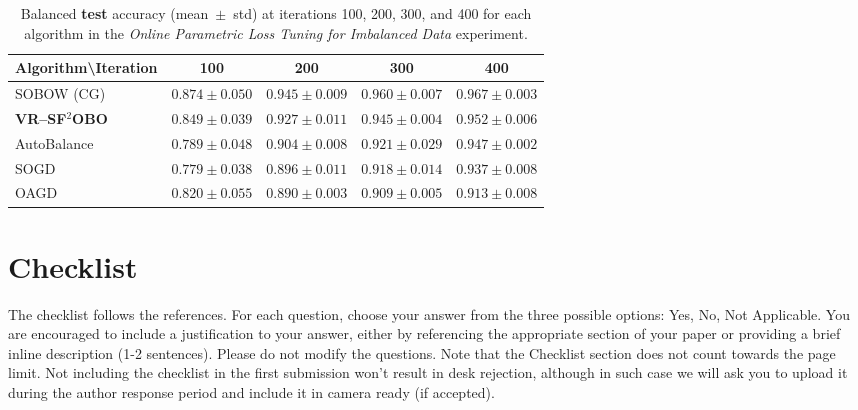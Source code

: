 \documentclass{uai2026} %
\begin{document}
\begin{table}[!htbp]
  \centering
  \begin{adjustbox}{max width=\linewidth}
  \begin{tabular}{lcccc}
    \toprule
    \textbf{Algorithm\textbackslash Iteration} & \textbf{100} & \textbf{200} & \textbf{300} & \textbf{400} \\
    \midrule
    SOBOW (CG)         & $0.874\!\pm\!0.050$ & $0.945\!\pm\!0.009$ & $0.960\!\pm\!0.007$ & $0.967\!\pm\!0.003$ \\
    \textbf{VR--SF$^2$OBO}        & $\mathbf{0.849\!\pm\!0.039}$ & $\mathbf{0.927\!\pm\!0.011}$ & $\mathbf{0.945\!\pm\!0.004}$ & $\mathbf{0.952\!\pm\!0.006}$ \\
    AutoBalance        & $0.789\!\pm\!0.048$ & $0.904\!\pm\!0.008$ & $0.921\!\pm\!0.029$ & $0.947\!\pm\!0.002$ \\
    SOGD               & $0.779\!\pm\!0.038$ & $0.896\!\pm\!0.011$ & $0.918\!\pm\!0.014$ & $0.937\!\pm\!0.008$ \\
    OAGD               & $0.820\!\pm\!0.055$ & $0.890\!\pm\!0.003$ & $0.909\!\pm\!0.005$ & $0.913\!\pm\!0.008$ \\
    \bottomrule
  \end{tabular}
  \end{adjustbox}
  \caption{Balanced \textbf{test} accuracy (mean$\;\pm\;$std) at iterations 100, 200, 300, and 400 for each algorithm in the \emph{Online Parametric Loss Tuning for Imbalanced Data} experiment.}
  \label{tab:online-parametric-test-mean-std}
\end{table}
\FloatBarrier








\section*{Checklist}


The checklist follows the references. For each question, choose your answer from the three possible options: Yes, No, Not Applicable.  You are encouraged to include a justification to your answer, either by referencing the appropriate section of your paper or providing a brief inline description (1-2 sentences). 
Please do not modify the questions.  Note that the Checklist section does not count towards the page limit. Not including the checklist in the first submission won't result in desk rejection, although in such case we will ask you to upload it during the author response period and include it in camera ready (if accepted).
\end{document}
